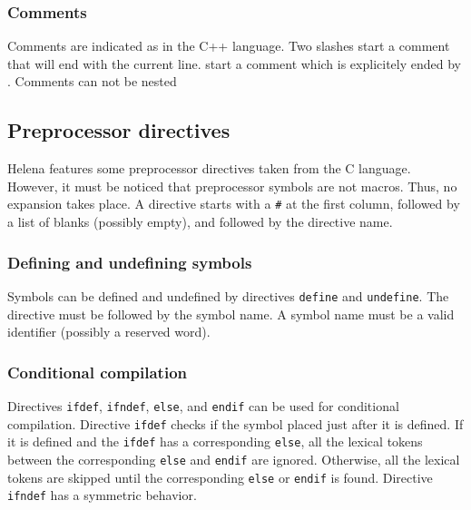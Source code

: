 \subsubsection{Comments}
Comments are indicated as in the C++ language.  Two slashes \LS{//}
start a comment that will end with the current line.  \LS{/*} start a
comment which is explicitely ended by \LS{*/}.  Comments can not be
nested

\subsection{Preprocessor directives}
Helena features some preprocessor directives taken from the C
language.  However, it must be noticed that preprocessor symbols are
not macros.  Thus, no expansion takes place.  A directive starts with
a \texttt{\#} at the first column, followed by a list of blanks
(possibly empty), and followed by the directive name.

\subsubsection{Defining and undefining symbols}
Symbols can be defined and undefined by directives \texttt{define} and
\texttt{undefine}.  The directive must be followed by the symbol name.
A symbol name must be a valid identifier (possibly a reserved word).

\subsubsection{Conditional compilation}
Directives \texttt{ifdef}, \texttt{ifndef}, \texttt{else}, and
\texttt{endif} can be used for conditional compilation.  Directive
\texttt{ifdef} checks if the symbol placed just after it is defined.
If it is defined and the \texttt{ifdef} has a corresponding
\texttt{else}, all the lexical tokens between the corresponding
\texttt{else} and \texttt{endif} are ignored.  Otherwise, all the
lexical tokens are skipped until the corresponding \texttt{else} or
\texttt{endif} is found.  Directive \texttt{ifndef} has a symmetric
behavior.

